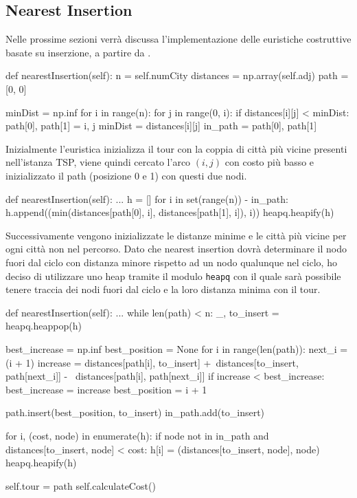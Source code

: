 \documentclass[a4paper,12pt]{report}
\begin{document}
\subsection{Nearest Insertion}
Nelle prossime sezioni verrà discussa l'implementazione delle euristiche costruttive basate su inserzione, a partire da .
\begin{python}
def nearestInsertion(self):
  n = self.numCity
  distances = np.array(self.adj)
  path = [0, 0]

  minDist = np.inf
  for i in range(n):
    for j in range(0, i):
      if distances[i][j] < minDist:
        path[0], path[1] = i, j
        minDist = distances[i][j]
  in_path = {path[0], path[1]}
\end{python}
Inizialmente l'euristica inizializza il tour con la coppia di città più vicine presenti nell'istanza TSP, viene quindi cercato l'arco $(i, j)$ con costo più basso e inizializzato il path (posizione 0 e 1) con questi due nodi.
\begin{python}
def nearestInsertion(self):
  ...
  h = []
  for i in set(range(n)) - in_path:
    h.append((min(distances[path[0], i], distances[path[1], i]), i))
  heapq.heapify(h)
\end{python}
Successivamente vengono inizializzate le distanze minime e le città più vicine per ogni città non nel percorso. Dato che nearest insertion dovrà determinare il nodo fuori dal ciclo con distanza minore rispetto ad un nodo qualunque nel ciclo, ho deciso di utilizzare uno heap tramite il modulo \lstinline!heapq! con il quale sarà possibile tenere traccia dei nodi fuori dal ciclo e la loro distanza minima con il tour.
\begin{python}
def nearestInsertion(self):
  ...
  while len(path) < n:
    _, to_insert = heapq.heappop(h)

    best_increase = np.inf
    best_position = None
    for i in range(len(path)):
      next_i = (i + 1) %
      increase = distances[path[i], to_insert] +\
                 distances[to_insert, path[next_i]] - \
                 distances[path[i], path[next_i]]
      if increase < best_increase:
        best_increase = increase
        best_position = i + 1

    path.insert(best_position, to_insert)
    in_path.add(to_insert)

    for i, (cost, node) in enumerate(h):
      if node not in in_path and distances[to_insert, node] < cost:
        h[i] = (distances[to_insert, node], node)
    heapq.heapify(h)

  self.tour = path
  self.calculateCost()
\end{python}
\end{document}
